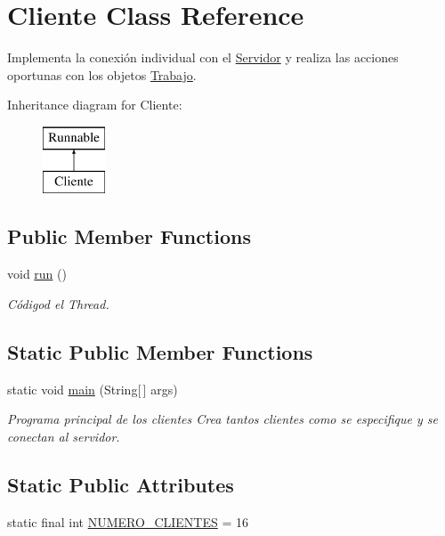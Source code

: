 \hypertarget{classCliente}{}\section{Cliente Class Reference}
\label{classCliente}


Implementa la conexión individual con el \hyperlink{classServidor}{Servidor} y realiza las acciones oportunas con los objetos \hyperlink{classTrabajo}{Trabajo}.  


Inheritance diagram for Cliente\+:\begin{figure}[H]
\begin{center}
\leavevmode
\includegraphics[height=2.000000cm]{classCliente}
\end{center}
\end{figure}
\subsection*{Public Member Functions}
\begin{DoxyCompactItemize}
\item 
void \hyperlink{classCliente_a18bd3f9c4d4006b311fd226ca5336dda}{run} ()
\begin{DoxyCompactList}\small\item\em Códigod el Thread. \end{DoxyCompactList}\end{DoxyCompactItemize}
\subsection*{Static Public Member Functions}
\begin{DoxyCompactItemize}
\item 
static void \hyperlink{classCliente_a221cda5443459d5da734d24d3b789ac0}{main} (String\mbox{[}$\,$\mbox{]} args)
\begin{DoxyCompactList}\small\item\em Programa principal de los clientes Crea tantos clientes como se especifique y se conectan al servidor. \end{DoxyCompactList}\end{DoxyCompactItemize}
\subsection*{Static Public Attributes}
\begin{DoxyCompactItemize}
\item 
static final int \hyperlink{classCliente_a48a0a2f19643c23979a654493e344bbb}{N\+U\+M\+E\+R\+O\+\_\+\+C\+L\+I\+E\+N\+T\+ES} = 16
\end{DoxyCompactItemize}



